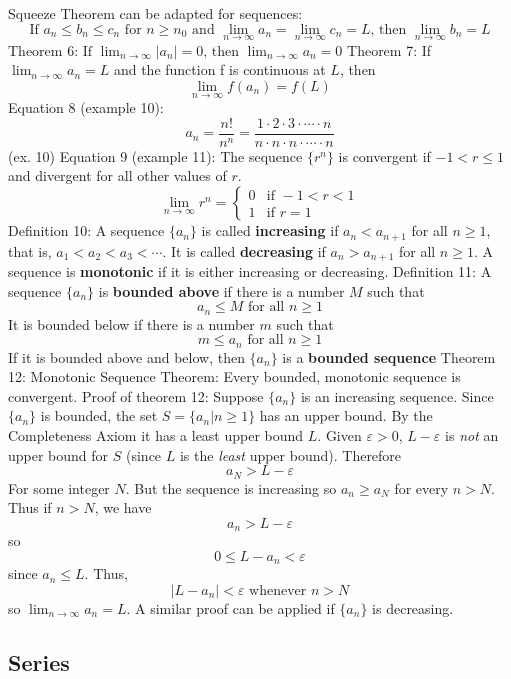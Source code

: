 \documentclass{article}
\begin{document}
\begin{outline}
        \1 Squeeze Theorem can be adapted for sequences: \[\text{If }a_n\leq b_n\leq c_n\text{ for }n\geq n_0\text{ and }\lim_{n\to\infty}a_n=\lim_{n\to\infty}c_n=L\text{, then }\lim_{n\to\infty}b_n=L\]
        \1 Theorem 6: \(\text{If }\lim_{n\to\infty}|a_n|=0\text{, then }\lim_{n\to\infty}a_n=0\)
        \1 Theorem 7: If \(\lim_{n\to\infty}a_n=L\) and the function f is continuous at $L$, then \[\lim_{n\to\infty}f(a_n)=f(L)\]
        \1 Equation 8 (example 10): \[a_n=\dfrac{n!}{n^n}=\dfrac{1\cdot2\cdot3\cdot\cdots\cdot n}{n\cdot n\cdot n\cdot\cdots\cdot n}\] (ex. 10)
        \1 Equation 9 (example 11): The sequence \(\{r^n\}\) is convergent if \(-1<r\leq 1\) and divergent for all other values of $r$. \[\lim_{n\to\infty}r^n=\begin{cases} 0 & \mbox{if } -1<r<1 \\ 1 & \mbox{if }r=1 \end{cases}\]
        \1 Definition 10: A sequence \(\{a_n\}\) is called \textbf{increasing} if \(a_n<a_{n+1}\) for all \(n\geq 1\), that is, \(a_1<a_2<a_3<\cdots\). It is called \textbf{decreasing} if \(a_n>a_{n+1}\) for all \(n\geq 1\). A sequence is \textbf{monotonic} if it is either increasing or decreasing. 
        \1 Definition 11: A sequence \(\{a_n\}\) is \textbf{bounded above} if there is a number $M$ such that \[a_n\leq M\mbox{    for all }n\geq 1\] It is bounded below if there is a number $m$ such that \[m\leq a_n\text{    for all }n\geq 1\] If it is bounded above and below, then \(\{a_n\}\) is a \textbf{bounded sequence}
        \1 Theorem 12: Monotonic Sequence Theorem: Every bounded, monotonic sequence is convergent. 
        \1 Proof of theorem 12: Suppose \(\{a_n\}\) is an increasing sequence. Since \(\{a_n\}\) is bounded, the set \(S=\{a_n|n\geq 1\}\) has an upper bound. By the Completeness Axiom it has a least upper bound $L$. Given \(\varepsilon>0\), \(L-\varepsilon\) is \textit{not} an upper bound for $S$ (since $L$ is the \textit{least} upper bound). Therefore \[a_N>L-\varepsilon\] For some integer $N$. But the sequence is increasing so \(a_n\geq a_N\) for every \(n>N\). Thus if \(n>N\), we have \[a_n>L-\varepsilon\] so \[0\leq L-a_n<\varepsilon\] since \(a_n\leq L\). Thus, \[|L-a_n|<\varepsilon\text{     whenever }n>N \] so \(\lim_{n\to\infty}a_n=L\). A similar proof can be applied if \(\{a_n\}\) is decreasing. 
    \end{outline}
    \subsection{Series}
    \begin{outline}
        
    \end{outline}
\end{document}
